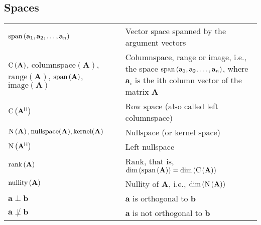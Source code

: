 \documentclass{article}
\renewcommand{\dim}[1]{\ensuremath{\textnormal{dim}\left(#1\right)}} %
\newcommand{\nullspace}[1]{\ensuremath{\textnormal{N}\left(#1\right)}} %
\newcommand{\nullity}[1]{\ensuremath{\textnormal{nullity}\left(#1\right)}} %
\renewcommand{\span}[1]{\ensuremath{\textnormal{span}\left(#1\right)}} %
\newcommand{\range}[1]{\ensuremath{\textnormal{C}\left(#1\right)}} %
\newcommand{\rank}[1]{\ensuremath{\textnormal{rank}\left(#1\right)}} %
\begin{document}
\subsection{Spaces}
\begin{xltabular}{\textwidth}{XX}
    \(\span{\mathbf{a}_1, \mathbf{a}_2, \dots, \mathbf{a}_n}\) & Vector space spanned by the argument vectors \cite{golubMatrixComputations2013}\\
    \(\range{\mathbf{A}}\), \(\mathrm{columnspace}(\mathbf{A})\), \(\mathrm{range}(\mathbf{A})\), \(\span{\mathbf{A}}\), \(\mathrm{image}(\mathbf{A})\) & Columnspace, range or image, i.e., the space \(\span{\mathbf{a}_1,\mathbf{a}_2, \dots, \mathbf{a}_n}\), where \(\mathbf{a}_i\) is the ith column vector of the matrix \(\mathbf{A}\) \cite{strangIntroductionLinearAlgebra1993, nossekAdaptiveArraySignal2015}\\
    \(\range{\mathbf{A}^\mathsf{H}}\) & Row space (also called left columnspace) \cite{strangIntroductionLinearAlgebra1993, nossekAdaptiveArraySignal2015}\\
    \(\nullspace{\mathbf{A}}, \mathrm{nullspace}(\mathbf{A}), \mathrm{kernel}(\mathbf{A})\) & Nullspace (or kernel space) \cite{strangIntroductionLinearAlgebra1993, nossekAdaptiveArraySignal2015}\\
    \(\nullspace{\mathbf{A^\mathsf{H}}}\) & Left nullspace\\
    \(\rank{\mathbf{A}}\) & Rank, that is, \(\dim{\span{\mathbf{A}}} = \dim{\range{\mathbf{A}}}\) \cite{nossekAdaptiveArraySignal2015} \\
    \(\nullity{\mathbf{A}}\) & Nullity of \(\mathbf{A}\), i.e., \(\dim{\nullspace{\mathbf{A}}}\)\\
    \(\mathbf{a} \perp \mathbf{b}\) & \(\mathbf{a}\) is orthogonal to \(\mathbf{b}\)\\
    \(\mathbf{a} \not\perp \mathbf{b}\) & \(\mathbf{a}\) is not orthogonal to \(\mathbf{b}\)\\
\end{xltabular}
\end{document}
